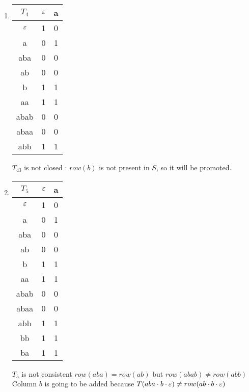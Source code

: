 \begin{enumerate}
  \item \begin{minipage}{0.3\textwidth}
          \begin{tabular}{c||c|c}
            $T_4$ & $\varepsilon$ & a \\
            \hline\hline
            $\varepsilon$  & 1    & 0 \\
            a     & 0    & 1 \\
            aba   & 0    & 0 \\
            ab    & 0    & 0 \\
            \hline\hline
            b     & 1    & 1 \\
            aa    & 1    & 1 \\
            abab  & 0    & 0 \\
            abaa  & 0    & 0 \\
            abb   & 1    & 1 \\
          \end{tabular}
        \end{minipage} \quad
        \begin{minipage}{0.5\textwidth}
          $T_43$ is not closed : $row(b)$ is not present in $S$, so it will be promoted.
        \end{minipage}

  \item \begin{minipage}{0.3\textwidth}
          \begin{tabular}{c||c|c}
            $T_5$ & $\varepsilon$ & a \\
            \hline\hline
            $\varepsilon$  & 1    & 0 \\
            a     & 0    & 1 \\
            aba   & 0    & 0 \\
            ab    & 0    & 0 \\
            b     & 1    & 1 \\
            \hline\hline
            aa    & 1    & 1 \\
            abab  & 0    & 0 \\
            abaa  & 0    & 0 \\
            abb   & 1    & 1 \\
            bb    & 1    & 1 \\
            ba    & 1    & 1 \\
          \end{tabular}
        \end{minipage} \quad
        \begin{minipage}{0.5\textwidth}
          $T_5$ is not consistent $row(aba) = row(ab)$ but $row(abab) \neq row(abb)$
          Column $b$ is going to be added because $T(aba \cdot b \cdot \varepsilon) \neq row(ab \cdot b \cdot \varepsilon)$
        \end{minipage}


\end{enumerate}
